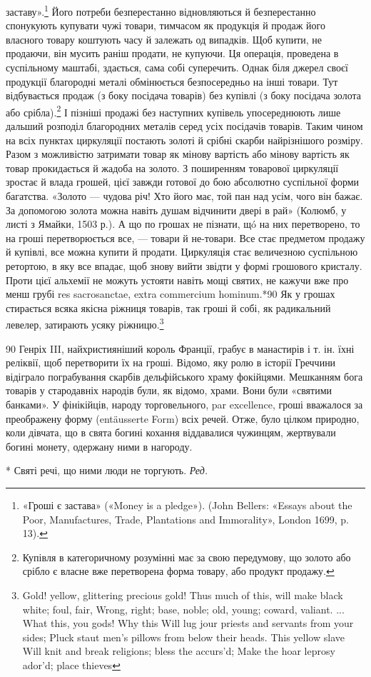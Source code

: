 заставу».\footnote{
«Гроші є застава» («Money is a pledge»). (John Bellers: «Essays
about the Poor, Manufactures, Trade, Plantations and Immorality», London
1699, p. 13).
} Його потреби безперестанно відновляються й безперестанно
спонукують купувати чужі товари, тимчасом як продукція
й продаж його власного товару коштують часу й залежать
од випадків. Щоб купити, не продаючи, він мусить раніш продати,
не купуючи. Ця операція, проведена в суспільному маштабі,
здається, сама собі суперечить. Однак біля джерел своєї продукції
благородні металі обмінюється безпосередньо на інші товари.
Тут відбувається продаж (з боку посідача товарів) без купівлі
(з боку посідача золота або срібла).\footnote{
Купівля в категоричному розумінні має за свою передумову, що
золото або срібло є власне вже перетворена форма товару, або продукт
продажу.
} І пізніші продажі без наступних
купівель упосереднюють лише дальший розподіл благородних
металів серед усіх посідачів товарів. Таким чином на
всіх пунктах циркуляції постають золоті й срібні скарби найрізнішого
розміру. Разом з можливістю затримати товар як
мінову вартість або мінову вартість як товар прокидається й
жадоба на золото. З поширенням товарової циркуляції зростає й
влада грошей, цієї завжди готової до бою абсолютно суспільної
форми багатства. «Золото — чудова річ! Хто його має, той пан
над усім, чого він бажає. За допомогою золота можна навіть
душам відчинити двері в рай» (Колюмб, у листі з Ямайки, 1503 р.).
А що по грошах не пізнати, щó на них перетворено, то на гроші
перетворюється все, — товари й не-товари. Все стає предметом
продажу й купівлі, все можна купити й продати. Циркуляція
стає величезною суспільною ретортою, в яку все впадає, щоб
знову вийти звідти у формі грошового кристалу. Проти цієї
альхемії не можуть устояти навіть мощі святих, не кажучи вже
про менш грубі res sacrosanctae, extra commercium hominum.*90
Як у грошах стирається всяка якісна ріжниця товарів, так гроші
й собі, як радикальний левелер, затирають усяку ріжницю.\footnote{
Gold! yellow, glittering precious gold!
Thus much of this, will make black white; foul, fair,
Wrong, right; base, noble; old, young; coward, valiant.
... What this, you gods! Why this
Will lug jour priests and servants from your sides;
Pluck staut men’s pillows from below their heads.
This yellow slave
Will knit and break religions; bless the accurs'd;
Make the hoar leprosy ador’d; place thieves
}

90    Генріх III, найхристияніший король Франції, грабує в манастирів
і т. ін. їхні реліквії, щоб перетворити їх на гроші. Відомо, яку ролю
в історії Греччини відіграло пограбування скарбів дельфійського храму
фокійцями. Мешканням бога товарів у стародавніх народів були, як відомо,
храми. Вони були «святими банками». У фінікійців, народу торговельного,
par excellence, гроші вважалося за преображену форму (entäusserte
Form) всіх речей. Отже, було цілком природно, коли дівчата, що в
свята богині кохання віддавалися чужинцям, жертвували богині монету,
одержану ними в нагороду.

* Святі речі, що ними люди не торгують. \emph{Ред.}
